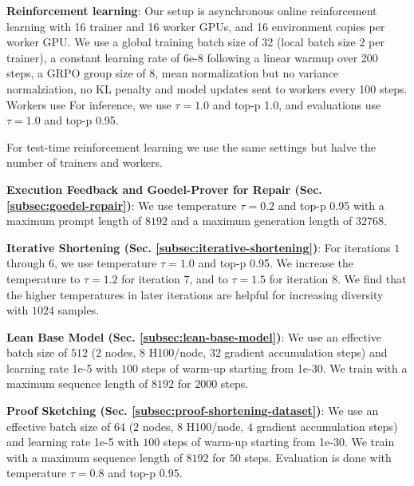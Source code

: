 \textbf{Reinforcement learning}: Our setup is asynchronous online reinforcement learning with 16 trainer and 16 worker GPUs, and 16 environment copies per worker GPU. We use a global training batch size of 32 (local batch size 2 per trainer), a constant learning rate of 6e-8 following a linear warmup over 200 steps, a GRPO group size of 8, mean normalization but no variance normalziation, no KL penalty and model updates sent to workers every 100 steps. Workers use  For inference, we use $\tau=1.0$ and top-p 1.0, and evaluations use $\tau=1.0$ and top-p 0.95.

For test-time reinforcement learning we use the same settings but halve the number of trainers and workers.

\textbf{Execution Feedback and Goedel-Prover for Repair (Sec. \ref{subsec:goedel-repair})}: We use temperature $\tau=0.2$ and top-p 0.95 with a maximum prompt length of $8192$ and a maximum generation length of $32768$.

\textbf{Iterative Shortening (Sec. \ref{subsec:iterative-shortening})}: For iterations $1$ through $6$, we use temperature $\tau=1.0$ and top-p 0.95. We increase the temperature to $\tau=1.2$ for iteration 7, and to $\tau=1.5$ for iteration 8. We find that the higher temperatures in later iterations are helpful for increasing diversity with $1024$ samples. 


\textbf{Lean Base Model (Sec. \ref{subsec:lean-base-model})}: We use an effective batch size of $512$ ($2$ nodes, $8$ H100/node, $32$ gradient accumulation steps) and learning rate 1e-5 with $100$ steps of warm-up starting from 1e-30. We train with a maximum sequence length of $8192$ for $2000$ steps.

\textbf{Proof Sketching (Sec. \ref{subsec:proof-shortening-dataset})}: We use an effective batch size of $64$ ($2$ nodes, $8$ H100/node, $4$ gradient accumulation steps) and learning rate 1e-5 with $100$ steps of warm-up starting from 1e-30. We train with a maximum sequence length of $8192$ for $50$ steps. Evaluation is done with temperature $\tau=0.8$ and top-p $0.95$.

